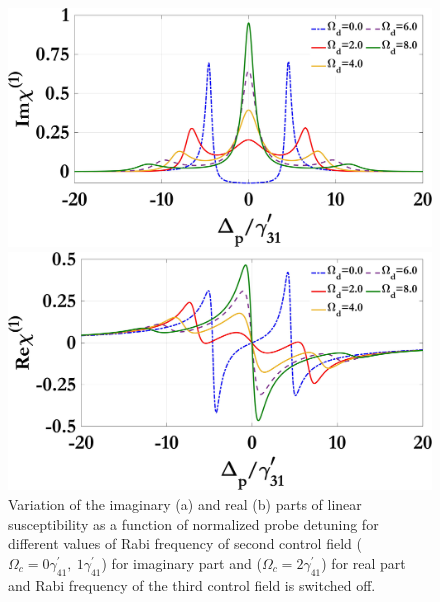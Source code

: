 \documentclass[a4paper,12pt]{article}
\begin{document}
\noindent
\begin{figure}[h]
  \centering
  \begin{minipage}[t]{0.48\textwidth}
    \centering
    \includegraphics[width=\linewidth]{Plots/Img_chi1_Omega_d.jpeg}
    \subcaption{}
  \end{minipage}%
  \hfill
  \begin{minipage}[t]{0.48\textwidth}
    \centering
    \includegraphics[width=\linewidth]{Plots/Real_chi1_Omega_d.jpeg}
    \subcaption{}
  \end{minipage}
  \caption{Variation of the imaginary (a) and real (b) parts of linear susceptibility as a function of normalized probe detuning for different values of Rabi frequency of second control field ($\Omega_c=0\gamma^{\prime}_{41},\ 1\gamma^{\prime}_{41}$) for imaginary part and ($\Omega_c=2\gamma^{\prime}_{41}$) for real part and Rabi frequency of the third control field is switched off.}
  \label{fig:chi1_omegad}
\end{figure}
\end{document}
